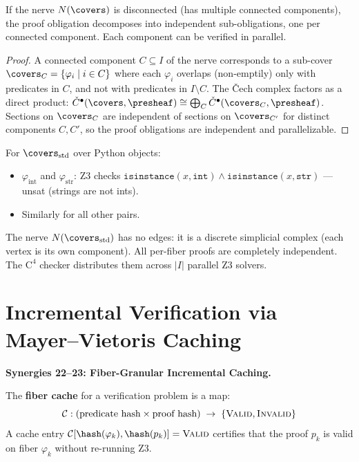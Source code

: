 \begin{proposition}
\label{prop:nerve-parallelism}
If the nerve $N(\covers)$ is disconnected (has multiple connected
components), the proof obligation decomposes into independent
sub-obligations, one per connected component.  Each component can be
verified in parallel.
\end{proposition}

\begin{proof}
A connected component $C \subseteq I$ of the nerve corresponds to a
sub-cover $\covers_C = \{\varphi_i \mid i \in C\}$ where each $\varphi_i$
overlaps (non-emptily) only with predicates in $C$, and not with
predicates in $I \setminus C$.  The \v{C}ech complex factors as a direct
product: $\check{C}^\bullet(\covers, \presheaf) \cong \bigoplus_C
\check{C}^\bullet(\covers_C, \presheaf)$.  Sections on $\covers_C$ are
independent of sections on $\covers_{C'}$ for distinct components $C, C'$,
so the proof obligations are independent and parallelizable.
\end{proof}

\begin{example}
For $\covers_{\mathrm{std}}$ over Python objects:
\begin{itemize}
\item $\varphi_{\mathrm{int}}$ and $\varphi_{\mathrm{str}}$: Z3 checks
  $\mathtt{isinstance}(x, \mathtt{int}) \wedge \mathtt{isinstance}(x,
  \mathtt{str})$ --- unsat (strings are not ints).
\item Similarly for all other pairs.
\end{itemize}
The nerve $N(\covers_{\mathrm{std}})$ has no edges: it is a discrete
simplicial complex (each vertex is its own component).  All
per-fiber proofs are completely independent.  The $\mathrm{C}^4$ checker
distributes them across $|I|$ parallel Z3 solvers.
\end{example}


\section{Incremental Verification via Mayer--Vietoris Caching}
\label{sec:incremental}

\noindent\textbf{Synergies 22--23: Fiber-Granular Incremental Caching.}

\begin{definition}
\label{def:fiber-cache}
The \textbf{fiber cache} for a verification problem is a map:
\[
  \mathcal{C} : (\text{predicate hash} \times \text{proof hash})
  \;\to\; \{\textsc{Valid}, \textsc{Invalid}\}
\]
A cache entry $\mathcal{C}[\hash(\varphi_k), \hash(p_k)] = \textsc{Valid}$
certifies that the proof $p_k$ is valid on fiber $\varphi_k$ without
re-running Z3.
\end{definition}

